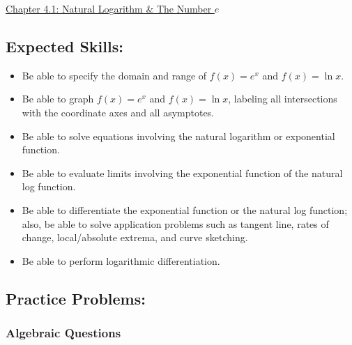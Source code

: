 \documentclass[12pt]{article}
\begin{document}
\begin{center}
\underline{\LARGE{Chapter 4.1: Natural Logarithm \& The Number $e$}}
\end{center}

\subsection*{Expected Skills:}

\begin{itemize}

\item Be able to specify the domain and range of $f(x)=e^x$ and $f(x)=\ln{x}$.

\item Be able to graph $f(x)=e^x$ and $f(x)=\ln{x}$, labeling all intersections with the coordinate axes and all asymptotes.

\item Be able to solve equations involving the natural logarithm or exponential function.

\item Be able to evaluate limits involving the exponential function of the natural log function.

\item Be able to differentiate the exponential function or the natural log function; also, be able to solve application problems such as tangent line, rates of change, local/absolute extrema, and curve sketching.

\item Be able to perform logarithmic differentiation.

\end{itemize}

\subsection*{Practice Problems: }

\subsubsection*{Algebraic Questions}
\end{document}
